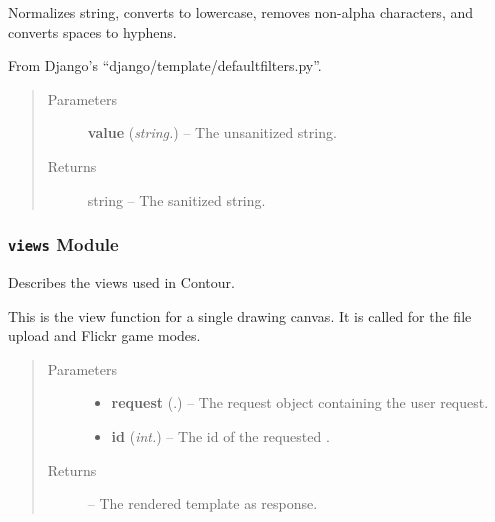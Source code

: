 \documentclass[letterpaper,10pt,english]{sphinxmanual}
\begin{document}
\begin{fulllineitems}
\label{Contour.contour:Contour.contour.util.slugify}
Normalizes string, converts to lowercase, removes non-alpha characters,
and converts spaces to hyphens.

From Django's ``django/template/defaultfilters.py''.
\begin{quote}\begin{description}
\item[{Parameters}] \leavevmode
\textbf{value} (\emph{string.}) -- The unsanitized string.

\item[{Returns}] \leavevmode
string -- The sanitized string.

\end{description}\end{quote}

\end{fulllineitems}



\subsubsection{\texttt{views} Module}
\label{Contour.contour:module-Contour.contour.views}\label{Contour.contour:views-module}
Describes the views used in Contour.

\begin{fulllineitems}
\label{Contour.contour:Contour.contour.views.canvas}
This is the view function for a single drawing canvas. It is called for the file upload and Flickr game modes.
\begin{quote}\begin{description}
\item[{Parameters}] \leavevmode\begin{itemize}
\item {} 
\textbf{request} (.) -- The request object containing the user request.

\item {} 
\textbf{id} (\emph{int.}) -- The id of the requested {\hyperref[Contour.contour:Contour.contour.models.Image]{}}.

\end{itemize}

\item[{Returns}] \leavevmode
{} -- The rendered template as response.

\end{description}\end{quote}

\end{fulllineitems}
\end{document}
